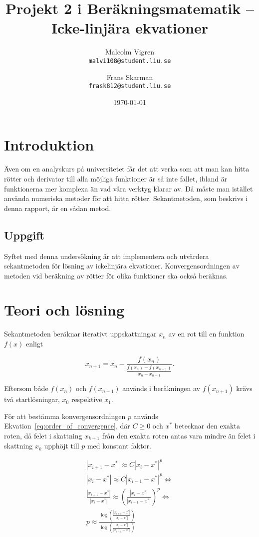 \documentclass[a4paper,titlepage]{article}
\title{%
    \textbf{Projekt 2 i Beräkningsmatematik -- Icke-linjära ekvationer }}
\date{\today}
\author{%
    Malcolm Vigren \\
    \texttt{malvi108@student.liu.se}
    \and
    Frans Skarman\\
    \texttt{frask812@student.liu.se}
    }
\begin{document}
\maketitle
\newpage
\tableofcontents
\newpage

\section{Introduktion}

Även om en analyskurs på universitetet får det att verka som att man kan hitta rötter
och derivator till alla möjliga funktioner är så inte fallet, ibland är funktionerna
mer komplexa än vad våra verktyg klarar av. Då måste man istället använda
numeriska metoder för att hitta rötter. Sekantmetoden, som beskrivs i denna
rapport, är en sådan metod.

\subsection{Uppgift}

Syftet med denna undersökning är att implementera och utvärdera sekantmetoden
för lösning av ickelinjära ekvationer. Konvergensordningen av metoden vid
beräkning av rötter för olika funktioner ska också beräknas.

\section{Teori och lösning}

Sekantmetoden beräknar iterativt uppskattningar $x_n$ av en rot till en
funktion $f(x)$ enligt

\begin{equation}
    \label{eq:seq}
    x_{n+1} = x_{n} -
    \frac{f(x_n)}
        {\frac{f(x_n) - f(x_{n-1})}
                {x_n - x_{n-1}}
        }.
\end{equation}

Eftersom både $f(x_n)$ och $f(x_{n-1})$ används i beräkningen av $f(x_{n+1})$ krävs
två startlösningar, $x_0$ respektive $x_1$.

För att bestämma konvergensordningen $p$ används Ekvation~\ref{eq:order_of_convergence}, där
$C \geq 0$ och $x^*$ betecknar den exakta roten, då felet i skattning $x_{k+1}$ 
från den exakta roten antas vara mindre än felet i skattning $x_{k}$ upphöjt till
$p$ med konstant faktor.

\begin{equation}
    \begin{gathered}
        |x_{i+1} - x^*| \approx C |x_i - x^*|^p \\
        |x_i - x^*| \approx C |x_{i-1} - x^*|^p \Leftrightarrow \\
        \frac{|x_{i+1} - x^*|}{|x_i - x^*|} \approx
                (\frac{|x_i - x^*|}{|x_{i-1} - x^*|})^p \Leftrightarrow \\

        p \approx \frac{\log(\frac{|x_{i+1} - x^*|}{|x_i -
        x^*|})}{\log(\frac{|x_i - x^*|}{|x_{i-1} - x^*|})}
    \end{gathered}
    \label{eq:order_of_convergence}
\end{equation}
\end{document}

